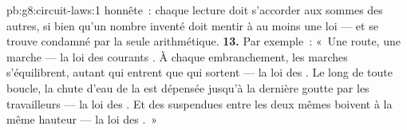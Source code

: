 \begin{solution}{pb:g8:circuit-laws:1}
honnête~: chaque lecture doit s'accorder aux sommes des autres, si
bien qu'un nombre inventé doit mentir à au moins une loi --- et se
trouve condamné par la seule arithmétique.
\textbf{13.} Par exemple~: «~Une route, une marche --- la loi des
courants . À chaque embranchement, les marches
s'équilibrent, autant qui entrent que qui sortent --- la loi des
. Le long de toute boucle, la chute d'eau de la  est
dépensée jusqu'à la dernière goutte par les travailleurs --- la loi
des  . Et des  suspendues entre les deux
mêmes  boivent à la même hauteur --- la loi des  .~»
\end{solution}
